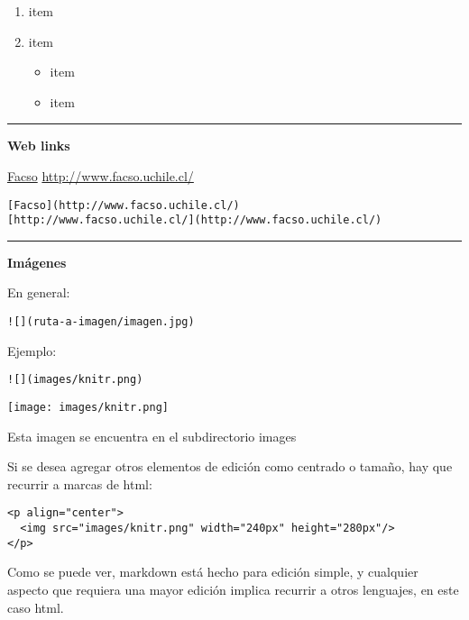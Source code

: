 \documentclass[
  11pt,
]{book}
\providecommand{\tightlist}{%
  \setlength{\itemsep}{0pt}\setlength{\parskip}{0pt}}
\begin{document}
\begin{enumerate}
\def\labelenumi{\arabic{enumi}.}
\tightlist
\item
  item
\item
  item

  \begin{itemize}
  \tightlist
  \item
    item
  \item
    item
  \end{itemize}
\end{enumerate}

\begin{center}\rule{0.5\linewidth}{0.5pt}\end{center}

\textbf{Web links}

\href{http://www.facso.uchile.cl/}{Facso}
\url{http://www.facso.uchile.cl/}

\begin{verbatim}
[Facso](http://www.facso.uchile.cl/)
[http://www.facso.uchile.cl/](http://www.facso.uchile.cl/)
\end{verbatim}

\begin{center}\rule{0.5\linewidth}{0.5pt}\end{center}

\textbf{Imágenes}

En general:

\begin{verbatim}
![](ruta-a-imagen/imagen.jpg)
\end{verbatim}

Ejemplo:

\begin{verbatim}
![](images/knitr.png)
\end{verbatim}

\texttt{[image: images/knitr.png]}

Esta imagen se encuentra en el subdirectorio images

Si se desea agregar otros elementos de edición como centrado o tamaño, hay que recurrir a marcas de html:

\begin{verbatim}
<p align="center">
  <img src="images/knitr.png" width="240px" height="280px"/>
</p>
\end{verbatim}

Como se puede ver, markdown está hecho para edición simple, y cualquier aspecto que requiera una mayor edición implica recurrir a otros lenguajes, en este caso html.
\end{document}

